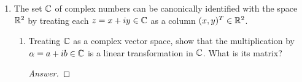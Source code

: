\documentclass[../psets.tex]{subfiles}
\begin{document}
\begin{enumerate}[label={\textbf{3.\arabic*.}}]
\begin{enumerate}
        \item $T:\Pm_n\to\Pm_n$ defined by $Tf(t)=f'(t)$ (find the matrix with respect to the standard basis $1,t,t^2,\dots,t^n$).
        \begin{proof}[Answer]
            \begin{equation*}
                \begin{pmatrix}
                    0 & 1 & 0 &        & 0\\
                    0 & 0 & 2 &        & 0\\
                      &   &   & \ddots &  \\
                    0 & 0 & 0 &        & n\\
                    0 & 0 & 0 &        & 0\\
                \end{pmatrix}
            \end{equation*}
        \end{proof}
        \item $T:\Pm_n\to\Pm_n$ defined by $Tf(t)=2f(t)+3f'(t)-4f''(t)$ (again with respect to the standard basis $1,t,t^2,\dots,t^n$).
        \begin{proof}[Answer]
            \begin{equation*}
                \begin{pmatrix}
                    2 & 3 & -8 &  & 0\\
                    0 & 2 & 6 & \ddots & 0\\
                    0 & 0 & 2 & \ddots & -4n(n-1)\\
                    \vdots & \vdots &  & \ddots & 3n\\
                    0 & 0 & 0 &  & 2\\
                \end{pmatrix}
            \end{equation*}
        \end{proof}
    \end{enumerate}
    \setcounter{enumi}{5}
    \item The set $\mathbb{C}$ of complex numbers can be canonically identified with the space $\mathbb{R}^2$ by treating each $z=x+iy\in\mathbb{C}$ as a column $(x,y)^T\in\mathbb{R}^2$.
    \begin{enumerate}
        \item Treating $\mathbb{C}$ as a complex vector space, show that the multiplication by $\alpha=a+ib\in\mathbb{C}$ is a linear transformation in $\mathbb{C}$. What is its matrix?
        \begin{proof}[Answer]

\end{proof}
\end{enumerate}
\end{enumerate}
\end{document}
